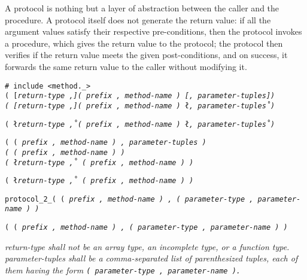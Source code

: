 A protocol is nothing but a layer of
abstraction between the caller and the procedure.
A protocol itself does not generate the return value: if all the argument
values satisfy their respective pre-conditions, then the protocol invokes
a procedure, which gives the return value to the protocol; the protocol then
verifies if the return value meets the given post-conditions, and on success,
it forwards the same return value to the caller without modifying it.

\pagebreak


\tt{# include <method._>}\\

\s\s\s\s\s\tt{(} [\it{return-type} \tt{,}]\s\tt{(} \it{prefix}
\tt{,} \it{method-name} \tt{)} [\tt{,} \it{parameter-tuples}]\s\tt{)}\\

\s\s\s\tt{(} [\it{return-type} \tt{,}]\s\tt{(} \it{prefix}
\tt{,} \it{method-name} \tt{)} \l\tt{,} \it{parameter-tuples}\r\s\tt{)}

\s\tt{(} \l\it{return-type} \tt{,}\r\s\tt{(}
\it{prefix} \tt{,} \it{method-name} \tt{)} \l\tt{,} \it{parameter-tuples}\r\s\tt{)}

\s\tt{(}   \tt{(} \it{prefix}
\tt{,} \it{method-name} \tt{)} \tt{,} \it{parameter-tuples} \tt{)}\\

\s\s\s\tt{(} \tt{(} \it{prefix}
\tt{,} \it{method-name} \tt{)} \tt{)}\\

\s\s\s\tt{(} \l\it{return-type} \tt{,}\r\s
\tt{(} \it{prefix} \tt{,} \it{method-name} \tt{)} \tt{)}

\s\tt{(} \l\it{return-type} \tt{,}\r\s
\tt{(} \it{prefix} \tt{,} \it{method-name} \tt{)} \tt{)}

\tt {protocol_2_}\s\s\s\tt{(} \tt{(} \it{prefix} \tt{,} \it{method-name} \tt{)}
\tt{,} \tt{(} \it{parameter-type} \tt{,} \it{parameter-name} \tt{)} \tt{)}

\s\tt{(} \tt{(} \it{prefix} \tt{,} \it{method-name} \tt{)}
\tt{,} \tt{(} \it{parameter-type} \tt{,} \it{parameter-name} \tt{)} \tt{)}


\it{return-type} shall not be an array type,
an incomplete type, or a function type.
\it{parameter-tuples} shall be a comma-separated list
of parenthesized tuples, each of them having the form
\tt{(} \it{parameter-type} \tt{,} \it{parameter-name} \tt{)}.

